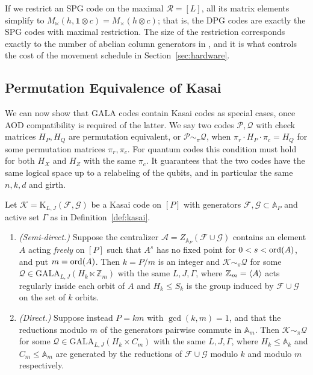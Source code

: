 If we restrict an SPG code on the maximal $\mathcal{R} = [L]$, all its matrix elements simplify to $M_\ltimes(h, \textbf{1}\otimes c) = M_\times(h\otimes c)$; that is, the DPG codes are exactly the SPG codes with maximal restriction. The size of the restriction corresponds exactly to the number of abelian column generators in \cite{zhao2026ultrahighratequantumerrorcorrection}, and it is what controls the cost of the movement schedule in Section~\ref{sec:hardware}.

\subsection{Permutation Equivalence of Kasai}\label{ssec:kasai-perm-eq}
We can now show that GALA codes contain Kasai codes as special cases, once AOD compatibility is required of the latter. We say two codes $\mathcal{P}, \mathcal{Q}$ with check matrices $H_P, H_Q$ are permutation equivalent, or $\mathcal{P}\sim_\pi \mathcal{Q}$, when $\pi_r\cdot H_P\cdot \pi_c = H_Q$ for some permutation matrices $\pi_r, \pi_c$. For quantum codes this condition must hold for both $H_X$ and $H_Z$ with the same $\pi_c$. It guarantees that the two codes have the same logical space up to a relabeling of the qubits, and in particular the same $n,k,d$ and girth.

\begin{proposition}\label{prop:kasai-containment}
Let $\mathcal{K}=\mathrm K_{L,J}(\mathcal F,\mathcal G)$ be a Kasai code on $[P]$ with generators $\mathcal{F},\mathcal{G}\subset\mathbb A_P$ and active set $\Gamma$ as in Definition~\ref{def:kasai}.
\begin{enumerate}
    \item \emph{(Semi-direct.)} Suppose the centralizer $\mathcal A = Z_{\mathbb A_P}(\mathcal F\cup\mathcal G)$ contains an element $A$ acting \emph{freely} on $[P]$ such that $A^s$ has no fixed point for $0<s<\mathrm{ord}(A)$, and put $m = \mathrm{ord}(A)$. Then $k = P/m$ is an integer and $\mathcal K\sim_\pi\mathcal Q$ for some $\mathcal Q\in\mathrm{GALA}_{L,J}(H_k\ltimes\mathbb Z_m)$ with the same $L,J,\Gamma$, where $\mathbb Z_m = \langle A \rangle$ acts regularly inside each orbit of $A$ and $H_k\leq S_k$ is the group induced by $\mathcal F\cup\mathcal G$ on the set of $k$ orbits.
    \item \emph{(Direct.)} Suppose instead $P = km$ with $\gcd(k,m) = 1$, and that the reductions modulo $m$ of the generators pairwise commute in $\mathbb A_m$. Then $\mathcal K\sim_\pi\mathcal Q$ for some $\mathcal Q\in\mathrm{GALA}_{L,J}(H_k\times C_m)$ with the same $L,J,\Gamma$, where $H_k\leq\mathbb A_k$ and $C_m\leq\mathbb A_m$ are generated by the reductions of $\mathcal F\cup\mathcal G$ modulo $k$ and modulo $m$ respectively.
\end{enumerate}
\end{proposition}

